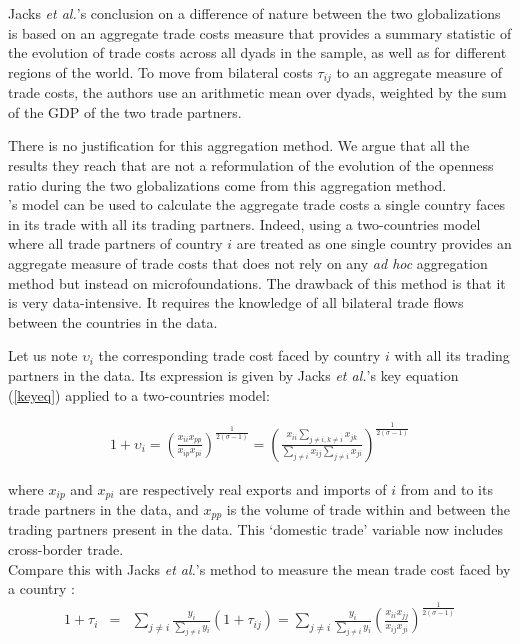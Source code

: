 \documentclass{article}
\begin{document}
Jacks \textit{et al.}'s conclusion on a difference of nature between the
two globalizations is based on an aggregate trade costs
measure that provides a summary statistic of the
evolution of trade costs across all dyads in the sample, as
well as for different regions of the world. To move from
bilateral costs $\tau_{ij}$ to an aggregate measure of trade
costs, the authors use an arithmetic mean over dyads, weighted
by the sum of the GDP of the two trade partners.

There is no justification for this aggregation method. We argue that
all the results they reach that are not a reformulation of the
evolution of the openness ratio during the two
globalizations come from this aggregation method.\\

\cite{AW2003}'s model can be used to calculate the aggregate
trade costs a single country faces in its trade with all
its trading partners. Indeed, using a two-countries model where
all trade partners of country $i$ are treated as one single
country provides an aggregate measure of trade costs that does
not rely on any \textit{ad hoc} aggregation method but instead on
microfoundations. The drawback of this method is that it is very data-intensive. It requires the knowledge of all bilateral trade flows between the countries in the data. 

Let us note $\upsilon_{i}$ the corresponding trade cost faced by country $i$ with all its trading partners in the data. Its expression is given by Jacks \textit{et al.}'s key equation (\ref{keyeq}) applied to a two-countries model:

\begin{eqnarray}
1+\upsilon_{i}= \left(\frac{x_{ii} x_{pp}}{x_{ip}
x_{pi}}\right)^{\frac{1}{2(\sigma-1)}}
=\left(\frac{x_{ii} \sum_{j \neq i, k \neq i } x_{jk}}{\sum_{j \neq i } x_{ij}\sum_{j \neq i} x_{ji}}\right)^{\frac{1}{2(\sigma-1)}}   \label{keyeq2model}
\end{eqnarray}

where $x_{ip}$ and $x_{pi}$ are respectively real exports and
imports of $i$ from and to its trade partners in the data, and
$x_{pp}$ is the volume of trade within and between the trading
partners present in the data. This `domestic trade' variable
now
includes cross-border trade. \\

Compare this with Jacks \textit{et al.}'s  method to measure the mean trade cost faced by a country : 
\begin{eqnarray}
1+\tau_i&=& \sum_{j \neq i}  {\frac{y_i}{\sum_{j \neq i} y_i} \left(1+\tau_{ij}\right)}
= \sum_{j \neq i}  {\frac{y_i}{\sum_{j \neq i} y_i} \left( \frac{x_{ii} x_{jj}}{x_{ij} x_{ji}}\right)^{\frac{1}{2(\sigma-1)}} }
 \label{jackssection3}
\end{eqnarray}
\end{document}
